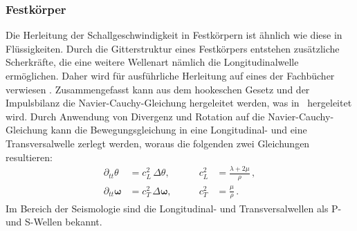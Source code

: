 \subsubsection*{Festkörper}
Die Herleitung der Schallgeschwindigkeit in Festkörpern ist ähnlich wie diese
in Flüssigkeiten. Durch die Gitterstruktur eines Festkörpers entstehen
zusätzliche Scherkräfte, die eine weitere Wellenart nämlich die
Longitudinalwelle ermöglichen. Daher wird für ausführliche Herleitung
auf eines der Fachbücher verwiesen \cite{schall:landaulifschitz,schall:gurtin}.
Zusammengefasst kann aus dem hookeschen Gesetz und der Impulsbilanz
die Navier-Cauchy-Gleichung hergeleitet werden, was in~\cite{openfoam:navierstokes}
hergeleitet wird.
Durch Anwendung von Divergenz und Rotation auf die Navier-Cauchy-Gleichung
kann die Bewegungsgleichung in eine Longitudinal- und eine Transversalwelle
zerlegt werden, woraus die folgenden zwei Gleichungen resultieren:
\[
\begin{aligned}
    \partial_{tt}\theta &= c_L^2\,\Delta\theta, & \qquad c_L^2 &= \frac{\lambda+2\mu}{\rho}\, ,\\
    \partial_{tt}\boldsymbol{\omega} &= c_T^2\,\Delta\boldsymbol{\omega}, & \qquad c_T^2 &= \frac{\mu}{\rho}\, .
\end{aligned}
\]
Im Bereich der Seismologie sind die Longitudinal- und Transversalwellen als
P- und S-Wellen bekannt.

